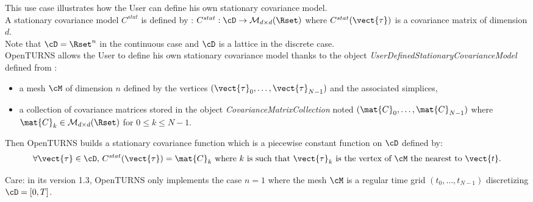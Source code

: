 \renewcommand{\filename}{docUC_StocProc_StationaryCovarianceFunction_UserDefined.tex}
\renewcommand{\filetitle}{UC : Creation of a  User defined stationary covariance function}

\HeaderIIILevel

\label{StationaryCovarianceModelCreation}

This use case illustrates how the User can define his own stationary covariance model.\\

A stationary covariance model $C^{stat}$ is defined by : $C^{stat}:  \cD \rightarrow  \mathcal{M}_{d \times d}(\Rset)$ where  $C^{stat}(\vect{\tau})$ is a covariance matrix of dimension $d$. \\
Note that $\cD=\Rset^n$ in the continuous case and $\cD$ is a lattice in the discrete case.\\


OpenTURNS allows the User to define his own stationary covariance model thanks to the object {\itshape UserDefinedStationaryCovarianceModel} defined from :
\begin{itemize}
\item a mesh $\cM$ of dimension $n$ defined by the vertices $(\vect{\tau}_0,\dots, \vect{\tau}_{N-1})$ and the associated simplices,
\item a collection of covariance matrices stored in the object \emph{CovarianceMatrixCollection} noted $(\mat{C}_0, \dots, \mat{C}_{N-1})$ where $\mat{C}_k \in \mathcal{M}_{d \times d}(\Rset)$ for $0 \leq k \leq N-1$.
\end{itemize}
Then OpenTURNS builds a stationary covariance function which is a piecewise constant function on $\cD$ defined by:
\begin{align*}
  \forall \vect{\tau} \in \cD, \, C^{stat}(\vect{\tau}) =  \mat{C}_k \mbox{ where } k \mbox{ is such that } \vect{\tau}_k \mbox{ is the  vertex of } \cM  \mbox{ the nearest to } \vect{t}.
\end{align*}


Care: in its version 1.3, OpenTURNS only implements the case $n=1$ where the mesh
$\cM$ is a regular time grid $(t_0, \dots, t_{N-1})$ discretizing $\cD=[0,T]$.\\




